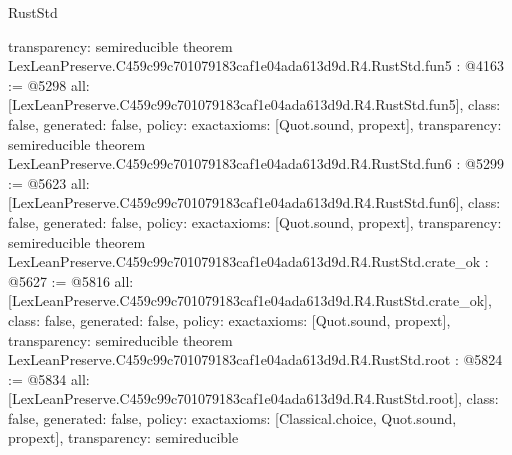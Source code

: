 \begin{lexlean}{RustStd}
\begin{coremodule}
{  transparency: semireducible
}
theorem LexLeanPreserve.C459c99c701079183caf1e04ada613d9d.R4.RustStd.fun5 : @4163 := @5298 {
  all: [LexLeanPreserve.C459c99c701079183caf1e04ada613d9d.R4.RustStd.fun5],
  class: false,
  generated: false,
  policy: exact{axioms: [Quot.sound, propext]},
  transparency: semireducible
}
theorem LexLeanPreserve.C459c99c701079183caf1e04ada613d9d.R4.RustStd.fun6 : @5299 := @5623 {
  all: [LexLeanPreserve.C459c99c701079183caf1e04ada613d9d.R4.RustStd.fun6],
  class: false,
  generated: false,
  policy: exact{axioms: [Quot.sound, propext]},
  transparency: semireducible
}
theorem LexLeanPreserve.C459c99c701079183caf1e04ada613d9d.R4.RustStd.crate_ok : @5627 := @5816 {
  all: [LexLeanPreserve.C459c99c701079183caf1e04ada613d9d.R4.RustStd.crate_ok],
  class: false,
  generated: false,
  policy: exact{axioms: [Quot.sound, propext]},
  transparency: semireducible
}
theorem LexLeanPreserve.C459c99c701079183caf1e04ada613d9d.R4.RustStd.root : @5824 := @5834 {
  all: [LexLeanPreserve.C459c99c701079183caf1e04ada613d9d.R4.RustStd.root],
  class: false,
  generated: false,
  policy: exact{axioms: [Classical.choice, Quot.sound, propext]},
  transparency: semireducible
}


\end{coremodule}
\end{lexlean}
